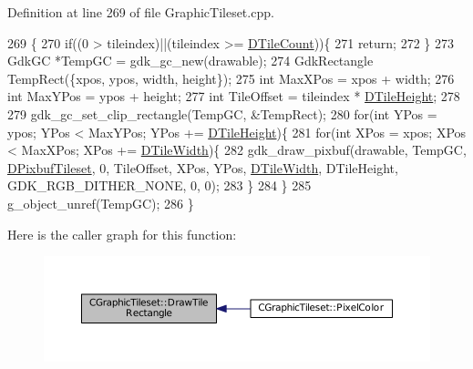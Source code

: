 Definition at line 269 of file Graphic\+Tileset.\+cpp.


\begin{DoxyCode}
269                                                                                                            
                     \{
270     \textcolor{keywordflow}{if}((0 > tileindex)||(tileindex >= \hyperlink{classCGraphicTileset_a39d942b370e47f441bf97385eb1037c8}{DTileCount}))\{
271         \textcolor{keywordflow}{return};
272     \}
273     GdkGC *TempGC = gdk\_gc\_new(drawable);
274     GdkRectangle TempRect(\{xpos, ypos, width, height\});
275     \textcolor{keywordtype}{int} MaxXPos = xpos + width;
276     \textcolor{keywordtype}{int} MaxYPos = ypos + height;
277     \textcolor{keywordtype}{int} TileOffset = tileindex * \hyperlink{classCGraphicTileset_af48f32e07d5fe69afd5f764318cc3244}{DTileHeight};
278     
279     gdk\_gc\_set\_clip\_rectangle(TempGC, &TempRect);
280     \textcolor{keywordflow}{for}(\textcolor{keywordtype}{int} YPos = ypos; YPos < MaxYPos; YPos += \hyperlink{classCGraphicTileset_af48f32e07d5fe69afd5f764318cc3244}{DTileHeight})\{
281         \textcolor{keywordflow}{for}(\textcolor{keywordtype}{int} XPos = xpos; XPos < MaxXPos; XPos += \hyperlink{classCGraphicTileset_a2d0c7d19865b81911a3a43d5cae50e00}{DTileWidth})\{
282             gdk\_draw\_pixbuf(drawable, TempGC, \hyperlink{classCGraphicTileset_a5d5adfcdbb347a6df3f57535ca08e3ef}{DPixbufTileset}, 0, TileOffset, XPos, YPos, 
      \hyperlink{classCGraphicTileset_a2d0c7d19865b81911a3a43d5cae50e00}{DTileWidth}, DTileHeight, GDK\_RGB\_DITHER\_NONE, 0, 0);
283         \}
284     \}
285     g\_object\_unref(TempGC);
286 \}
\end{DoxyCode}
Here is the caller graph for this function\+:\nopagebreak
\begin{figure}[H]
\begin{center}
\leavevmode
\includegraphics[width=350pt]{classCGraphicTileset_a81114be934d1efca29eb194fc2429658_icgraph}
\end{center}
\end{figure}
\hypertarget{classCGraphicTileset_a78db70086b4cd1085fd3b5d0d0dc5fdd}{}\label{classCGraphicTileset_a78db70086b4cd1085fd3b5d0d0dc5fdd} 
